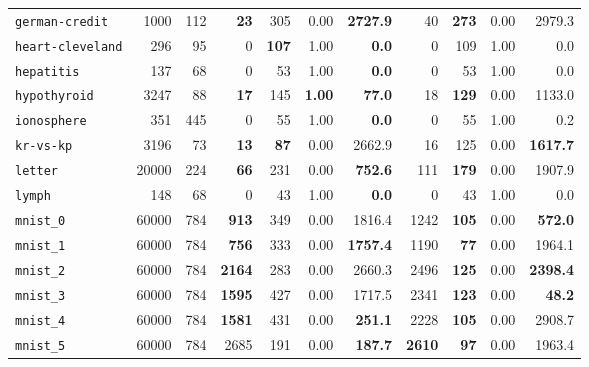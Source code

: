 \begin{tabular}{lccrrrrrrrr}
\texttt{german-credit} & \multicolumn{1}{r}{1000} & \multicolumn{1}{r}{112}  & \textbf{23} & 305 & 0.00 & \textbf{2727.9} & 40 & \textbf{273} & 0.00 & 2979.3\\
\texttt{heart-cleveland} & \multicolumn{1}{r}{296} & \multicolumn{1}{r}{95}  & 0 & \textbf{107} & 1.00 & \textbf{0.0} & 0 & 109 & 1.00 & 0.0\\
\texttt{hepatitis} & \multicolumn{1}{r}{137} & \multicolumn{1}{r}{68}  & 0 & 53 & 1.00 & \textbf{0.0} & 0 & 53 & 1.00 & 0.0\\
\texttt{hypothyroid} & \multicolumn{1}{r}{3247} & \multicolumn{1}{r}{88}  & \textbf{17} & 145 & \textbf{1.00} & \textbf{77.0} & 18 & \textbf{129} & 0.00 & 1133.0\\
\texttt{ionosphere} & \multicolumn{1}{r}{351} & \multicolumn{1}{r}{445}  & 0 & 55 & 1.00 & \textbf{0.0} & 0 & 55 & 1.00 & 0.2\\
\texttt{kr-vs-kp} & \multicolumn{1}{r}{3196} & \multicolumn{1}{r}{73}  & \textbf{13} & \textbf{87} & 0.00 & 2662.9 & 16 & 125 & 0.00 & \textbf{1617.7}\\
\texttt{letter} & \multicolumn{1}{r}{20000} & \multicolumn{1}{r}{224}  & \textbf{66} & 231 & 0.00 & \textbf{752.6} & 111 & \textbf{179} & 0.00 & 1907.9\\
\texttt{lymph} & \multicolumn{1}{r}{148} & \multicolumn{1}{r}{68}  & 0 & 43 & 1.00 & \textbf{0.0} & 0 & 43 & 1.00 & 0.0\\
\texttt{mnist\_0} & \multicolumn{1}{r}{60000} & \multicolumn{1}{r}{784}  & \textbf{913} & 349 & 0.00 & 1816.4 & 1242 & \textbf{105} & 0.00 & \textbf{572.0}\\
\texttt{mnist\_1} & \multicolumn{1}{r}{60000} & \multicolumn{1}{r}{784}  & \textbf{756} & 333 & 0.00 & \textbf{1757.4} & 1190 & \textbf{77} & 0.00 & 1964.1\\
\texttt{mnist\_2} & \multicolumn{1}{r}{60000} & \multicolumn{1}{r}{784}  & \textbf{2164} & 283 & 0.00 & 2660.3 & 2496 & \textbf{125} & 0.00 & \textbf{2398.4}\\
\texttt{mnist\_3} & \multicolumn{1}{r}{60000} & \multicolumn{1}{r}{784}  & \textbf{1595} & 427 & 0.00 & 1717.5 & 2341 & \textbf{123} & 0.00 & \textbf{48.2}\\
\texttt{mnist\_4} & \multicolumn{1}{r}{60000} & \multicolumn{1}{r}{784}  & \textbf{1581} & 431 & 0.00 & \textbf{251.1} & 2228 & \textbf{105} & 0.00 & 2908.7\\
\texttt{mnist\_5} & \multicolumn{1}{r}{60000} & \multicolumn{1}{r}{784}  & 2685 & 191 & 0.00 & \textbf{187.7} & \textbf{2610} & \textbf{97} & 0.00 & 1963.4\\

\end{tabular}
